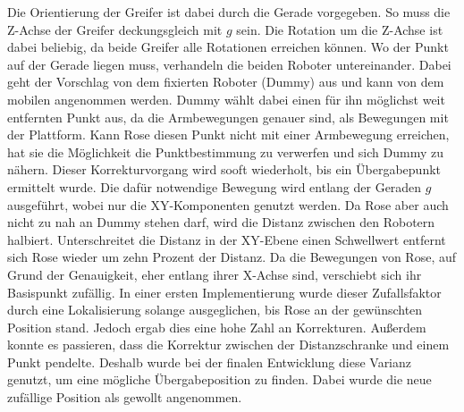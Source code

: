 Die Orientierung der Greifer ist dabei durch die Gerade vorgegeben. So muss die Z-Achse der Greifer deckungsgleich mit $g$ sein. Die Rotation um die Z-Achse ist dabei beliebig, da beide Greifer alle Rotationen erreichen können. Wo der Punkt auf der Gerade liegen muss, verhandeln die beiden Roboter untereinander. Dabei geht der Vorschlag von dem fixierten Roboter (Dummy) aus und kann von dem mobilen angenommen werden. Dummy wählt dabei einen für ihn möglichst weit entfernten Punkt aus, da die Armbewegungen genauer sind, als Bewegungen mit der Plattform. Kann Rose diesen Punkt nicht mit einer Armbewegung erreichen, hat sie die Möglichkeit die Punktbestimmung zu verwerfen und sich Dummy zu nähern.  Dieser Korrekturvorgang wird sooft wiederholt, bis ein Übergabepunkt ermittelt wurde. Die dafür notwendige Bewegung wird entlang der Geraden $g$ ausgeführt, wobei nur die XY-Komponenten genutzt werden. Da Rose aber auch nicht zu nah an Dummy stehen darf, wird die Distanz zwischen den Robotern halbiert. Unterschreitet die Distanz in der XY-Ebene einen Schwellwert entfernt sich Rose wieder um zehn Prozent der Distanz. Da die Bewegungen von Rose, auf Grund der Genauigkeit, eher entlang ihrer X-Achse sind, verschiebt sich ihr Basispunkt zufällig. In einer ersten Implementierung wurde dieser Zufallsfaktor durch eine Lokalisierung solange ausgeglichen, bis Rose an der gewünschten Position stand. Jedoch ergab dies eine hohe Zahl an Korrekturen. Außerdem konnte es passieren, dass die Korrektur zwischen der Distanzschranke und einem Punkt pendelte. Deshalb wurde bei der finalen Entwicklung diese Varianz genutzt, um eine mögliche Übergabeposition zu finden. Dabei wurde die neue zufällige Position als gewollt angenommen.